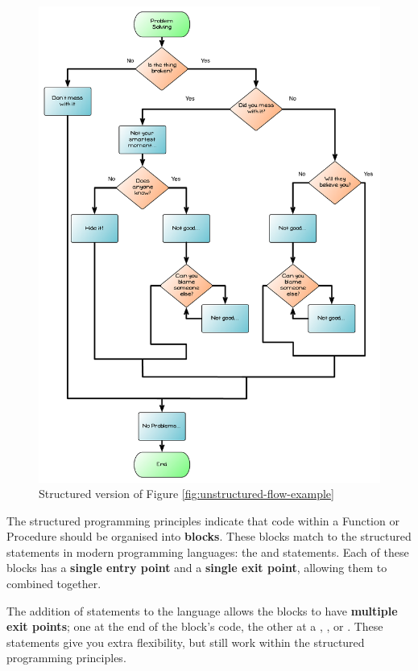 \begin{figure}[htbp]
   \centering
   \includegraphics[width=\textwidth]{./topics/control-flow/diagrams/StructuredFlowSample} 
   \caption{Structured version of Figure \ref{fig:unstructured-flow-example}}
   \label{fig:structured-flow-example}
\end{figure}

The structured programming principles indicate that code within a Function or Procedure should be organised into \textbf{blocks}. These blocks match to the structured statements in modern programming languages: the  and  statements. Each of these blocks has a \textbf{single entry point} and a \textbf{single exit point}, allowing them to combined together.

The addition of  statements to the language allows the blocks to have \textbf{multiple exit points}; one at the end of the block's code, the other at a , , or . These statements give you extra flexibility, but still work within the structured programming principles.

